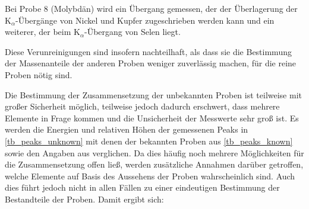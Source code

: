 \documentclass[
	a4paper,
	12pt,
	pagesize,
	ngerman
]{scrartcl}
\begin{document}
	Bei Probe 8 (Molybdän) wird ein Übergang gemessen, der der Überlagerung der $\text{K}_\alpha$-Übergänge von Nickel und Kupfer zugeschrieben werden kann und ein weiterer, der beim $\text{K}_\alpha$-Übergang von Selen liegt.

	Diese Verunreinigungen sind insofern nachteilhaft, als dass sie die Bestimmung der Massenanteile der anderen Proben weniger zuverlässig machen, für die reine Proben nötig sind.

	Die Bestimmung der Zusammensetzung der unbekannten Proben ist teilweise mit großer Sicherheit möglich, teilweise jedoch dadurch erschwert, dass mehrere Elemente in Frage kommen und die Unsicherheit der Messwerte sehr groß ist.
	Es werden die Energien und relativen Höhen der gemessenen Peaks in \cref{tb_peaks_unknown} mit denen der bekannten Proben aus \cref{tb_peaks_known} sowie den Angaben aus \cite{XRAYDB} verglichen.
	Da dies häufig noch mehrere Möglichkeiten für die Zusammensetzung offen ließ, werden zusätzliche Annahmen darüber getroffen, welche Elemente auf Basis des Aussehens der Proben wahrscheinlich sind.
	Auch dies führt jedoch nicht in allen Fällen zu einer eindeutigen Bestimmung der Bestandteile der Proben.
	Damit ergibt sich:
\end{document}

